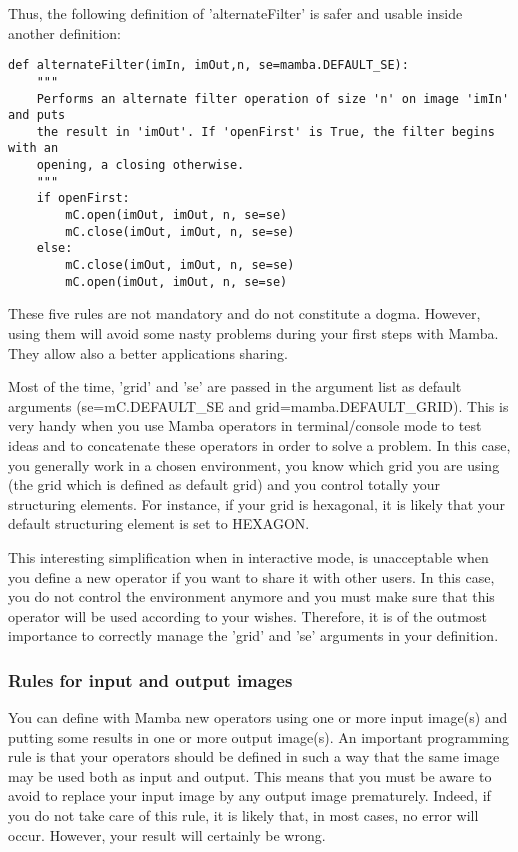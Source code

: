 \documentclass[a4paper,10pt,oneside]{article}
\begin{document}
Thus, the following definition of 'alternateFilter' is safer and usable inside 
another definition:

\lstset{language=Python}
\begin{lstlisting}
def alternateFilter(imIn, imOut,n, se=mamba.DEFAULT_SE):
    """
    Performs an alternate filter operation of size 'n' on image 'imIn' and puts
    the result in 'imOut'. If 'openFirst' is True, the filter begins with an
    opening, a closing otherwise.
    """
    if openFirst:
        mC.open(imOut, imOut, n, se=se)
        mC.close(imOut, imOut, n, se=se)
    else:
        mC.close(imOut, imOut, n, se=se)
        mC.open(imOut, imOut, n, se=se)
\end{lstlisting}

These five rules are not mandatory and do not constitute a dogma. However, 
using them will avoid some nasty problems during your first steps with Mamba. 
They allow also a better applications sharing.

Most of the time, 'grid' and 'se' are passed in the argument list as default 
arguments (se=mC.DEFAULT\_SE and grid=mamba.DEFAULT\_GRID). This is very handy 
when you use Mamba operators in terminal/console mode to test ideas and to 
concatenate these operators in order to solve a problem. In this case, you 
generally work in a chosen environment, you know which grid you are using (the 
grid which is defined as default grid) and you control totally your structuring 
elements. For instance, if your grid is hexagonal, it is likely that your 
default structuring element is set to HEXAGON.

This interesting simplification when in interactive mode, is unacceptable when 
you define a new operator if you want to share it with other users. In this 
case, you do not control the environment anymore and you must make sure that 
this operator will be used according to your wishes. Therefore, it is of the 
outmost importance to correctly manage the 'grid' and 'se' arguments in your 
definition. 
 
\subsubsection{Rules for input and output images}

You can define with Mamba new operators using one or more input image(s) and 
putting some results in one or more output image(s). An important programming 
rule is that your operators should be defined in such a way that the same image 
may be used both as input and output. This means that you must be aware to 
avoid to replace your input image by any output image prematurely. Indeed, if 
you do not take care of this rule, it is likely that, in most cases, no error 
will occur. However, your result will certainly be wrong.\par
\end{document}
